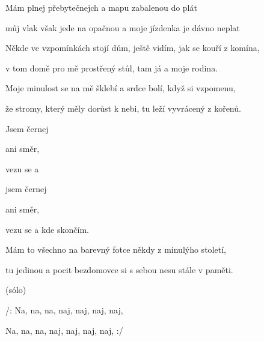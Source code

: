 

\zs
Mám  plnej přebytečnejch  a mapu zabalenou do plát 

můj vlak však jede na opačnou  a moje jízdenka je dávno neplat 
\ks

    

\zs
Někde ve vzpomínkách stojí dům, ještě vidím, jak se kouří z komína,

v tom domě pro mě prostřený stůl, tam já a moje rodina.

Moje minulost se na mě šklebí a srdce bolí, když si vzpomenu,

že stromy, který měly dorůst k nebi, tu leží vyvrácený z kořenů.
\ks

    

\zr
Jsem černej 

  ani směr,

vezu se   a 

jsem černej 

  ani směr,

vezu se   a  kde skončím.
\kr

\zs
Mám to všechno na barevný fotce někdy z minulýho století,

tu jedinou a pocit bezdomovce si s sebou nesu stále v paměti.
\ks

    

\zr \kr

\zr(sólo)\kr

\zs

/: Na, na, na, naj, naj, naj, naj, 
 
Na, na, na, naj, naj, naj, naj,  :/
\ks

\kp
